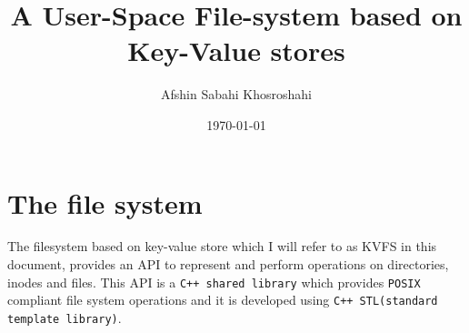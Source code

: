 \documentclass[bsc,frontabs,twoside,singlespacing,parskip,deptreport]{infthesis}     %
\begin{document}
\title{A User-Space File-system based on Key-Value stores}

\author{Afshin Sabahi Khosroshahi}



\date{\today}


\maketitle


\tableofcontents


\chapter{The file system}

The filesystem based on key-value store which I will refer to as KVFS in this document, provides an API to represent and perform operations on directories, inodes and files. This API is a {\tt C++ shared library} which provides {\tt POSIX} compliant file system operations and it is developed using {\tt C++ STL(standard template library)}.
\end{document}
